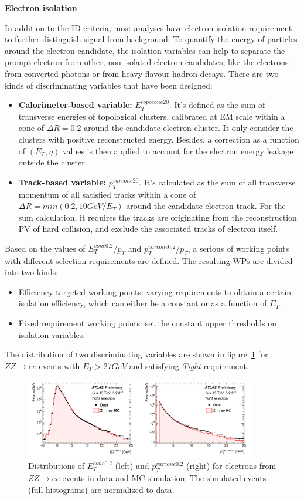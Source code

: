 \textbf{Electron isolation}

In addition to the ID criteria, most analyses have electron isolation requirement to further distinguish signal from background.
To quantify the energy of particles around the electron candidate, the isolation variables can help to separate the prompt electron from other, non-isolated electron candidates, like the electrons from converted photons or from heavy flavour hadron decays.
There are two kinds of discriminating variables that have been designed:
\begin{itemize}
	\item \textbf{Calorimeter-based variable:} $E_{T}^{topocone20}$. It's defined as the sum of transverse energies of topological clusters\cite{Aad:2016upy}, calibrated at EM scale within a cone of $\Delta R = 0.2$ around the candidate electron cluster. It only consider the clusters with positive reconstructed energy. Besides, a correction as a function of $(E_{T}, \eta)$ values is then applied to account for the electron energy leakage outside the cluster.
	\item \textbf{Track-based variable:} $p_{T}^{varcone20}$. It's calculated as the sum of all transverse momentum of all satisfied tracks within a cone of $\Delta R = min(0.2, 10 GeV/E_{T})$ around the candidate electron track. For the sum calculation, it requires the tracks are originating from the reconstruction PV of hard collision, and exclude the associated tracks of electron itself.
\end{itemize}
Based on the values of $E_{T}^{cone0.2}/p_{T}$ and $p_{T}^{varcone0.2}/p_{T}$, a serious of working points with different selection requirements are defined.
The resulting WPs are divided into two kinds:
\begin{itemize}
	\item Efficiency targeted working points: varying requirements to obtain a certain isolation efficiency, which can either be a constant or as a function of $E_{T}$.
	\item Fixed requirement working points: set the constant upper thresholds on isolation variables.
\end{itemize}
The distribution of two discriminating variables are shown in figure~\ref{fig:ele_iso} for $ZZ \rightarrow ee$ events with $E_{T} > 27 GeV$ and satisfying \textit{Tight} requirement.
\begin{figure}[!htb]
  \centering
  \includegraphics[width=0.9\textwidth]{figures/Simulation/ele_iso.png}
  \caption{Distributions of $E_{T}^{cone0.2}$ (left) and $p_{T}^{varcone0.2}$ (right) for electrons from $ZZ \rightarrow ee$ events in data and MC simulation. The simulated events (full histograms) are normalized to data.}
  \label{fig:ele_iso}
\end{figure}

